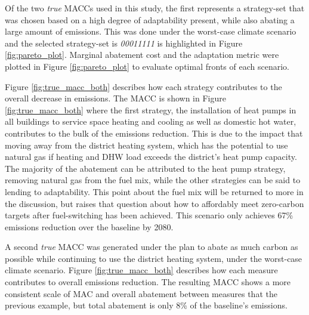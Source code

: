 \documentclass[twocolumn, a4paper,10pt]{article}
\begin{document}
Of the two \textit{true} MACCs used in this study, the first represents a strategy-set that was chosen based on a high degree of adaptability present, while also abating a large amount of emissions. This was done under the worst-case climate scenario and the selected strategy-set is \textit{00011111} is highlighted in Figure \ref{fig:pareto_plot}. Marginal abatement cost and the adaptation metric were plotted in Figure \ref{fig:pareto_plot} to evaluate optimal fronts of each scenario.

Figure \ref{fig:true_macc_both} describes how each strategy contributes to the overall decrease in emissions. The MACC is shown in Figure \ref{fig:true_macc_both} where the first strategy, the installation of heat pumps in all buildings to service space heating and cooling as well as domestic hot water, contributes to the bulk of the emissions reduction. This is due to the impact that moving away from the district heating system, which has the potential to use natural gas if heating and DHW load exceeds the district's heat pump capacity. The majority of the abatement can be attributed to the heat pump strategy, removing natural gas from the fuel mix, while the other strategies can be said to lending to adaptability. This point about the fuel mix will be returned to more in the discussion, but raises that question about how to affordably meet zero-carbon targets after fuel-switching has been achieved. This scenario only achieves 67\% emissions reduction over the baseline by 2080.

A second \textit{true} MACC was generated under the plan to abate as much carbon as possible while continuing to use the district heating system, under the worst-case climate scenario. Figure \ref{fig:true_macc_both} describes how each measure contributes to overall emissions reduction. The resulting MACC shows a more consistent scale of MAC and overall abatement between measures that the previous example, but total abatement is only 8\% of the baseline's emissions.
\end{document}
